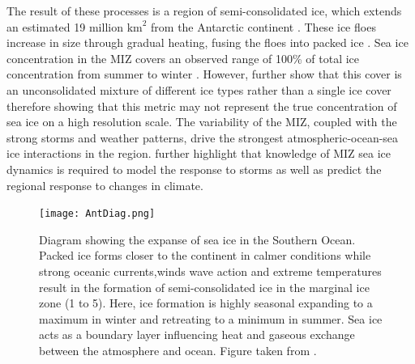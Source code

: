 The result of these processes is a region of semi-consolidated ice, which extends an estimated 19 million $\text{km}^2$ from the Antarctic continent \cite{MAKSYM2012seaiceextent}. These ice floes increase in size through gradual heating, fusing the floes into packed ice \cite{arrigo2004large}. Sea ice concentration in the MIZ covers an observed range of 100\% of total ice concentration from summer to winter \cite{alberello2019drift}. However, \textcite{alberello2019drift} further show that this cover is an unconsolidated mixture of different ice types rather than a single ice cover therefore showing that this metric may not represent the true concentration of sea ice on a high resolution scale. The variability of the MIZ, coupled with the strong storms and weather patterns, drive the strongest atmospheric-ocean-sea ice interactions in the region. \textcite{alberello2019drift} further highlight that knowledge of MIZ sea ice dynamics is required to model the response to storms as well as predict the regional response to changes in climate.

\begin{figure}[H]
	\centering
	\texttt{[image: AntDiag.png]}
	\caption{Diagram showing the expanse of sea ice in the Southern Ocean. Packed ice forms closer to the continent in calmer conditions while strong oceanic currents,winds wave action and extreme temperatures result in the formation of semi-consolidated ice in the marginal ice zone (1 to 5). Here, ice formation is highly seasonal expanding to a maximum in winter and retreating to a minimum in summer. Sea ice acts as a boundary layer influencing heat and gaseous  exchange between the atmosphere and ocean. Figure taken from \textcite{Antseaice}.}
	\label{fig:AntaDiag}
\end{figure}

